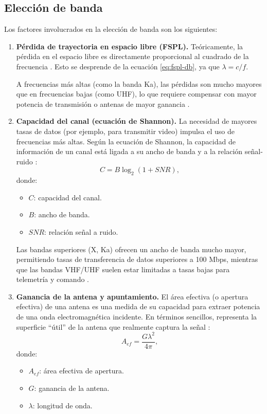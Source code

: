 \documentclass[12pt,a4paper]{article}
\begin{document}
\subsection{Elección de banda}\label{elecciuxf3n-de-banda}

Los factores involucrados en la elección de banda son los siguientes:

\begin{enumerate}
\item \textbf{Pérdida de trayectoria en espacio libre (FSPL).} Teóricamente, la pérdida en el espacio libre es directamente proporcional al cuadrado de la frecuencia \cite{ref39}. Esto se desprende de la ecuación \eqref{eq:fspl-db}, ya que $\lambda = c/f$.

A frecuencias más altas (como la banda Ka), las pérdidas son mucho mayores que en frecuencias bajas (como UHF), lo que requiere compensar con mayor potencia de transmisión o antenas de mayor ganancia \cite{ref39}.

\item \textbf{Capacidad del canal (ecuación de Shannon).} La necesidad de mayores tasas de datos (por ejemplo, para transmitir video) impulsa el uso de frecuencias más altas. Según la ecuación de Shannon, la capacidad de información de un canal está ligada a su ancho de banda y a la relación señal-ruido \cite{ref39}:
\begin{equation}
  C = B\log_{2}(1 + SNR),
  \label{eq:shannon}
\end{equation}
donde:
\begin{itemize}
\item $C$: capacidad del canal.
\item $B$: ancho de banda.
\item $SNR$: relación señal a ruido.
\end{itemize}

Las bandas superiores (X, Ka) ofrecen un ancho de banda mucho mayor, permitiendo tasas de transferencia de datos superiores a 100 Mbps, mientras que las bandas VHF/UHF suelen estar limitadas a tasas bajas para telemetría y comando \cite{ref39}.

\item \textbf{Ganancia de la antena y apuntamiento.} El área efectiva (o apertura efectiva) de una antena es una medida de su capacidad para extraer potencia de una onda electromagnética incidente. En términos sencillos, representa la superficie ``útil'' de la antena que realmente captura la señal \cite{ref39}:
\begin{equation}
  A_{ef} = \frac{G\lambda^{2}}{4\pi},
  \label{eq:area-efectiva}
\end{equation}
donde:
\begin{itemize}
\item $A_{ef}$: área efectiva de apertura.
\item $G$: ganancia de la antena.
\item $\lambda$: longitud de onda.
\end{itemize}


\end{enumerate}
\end{document}
